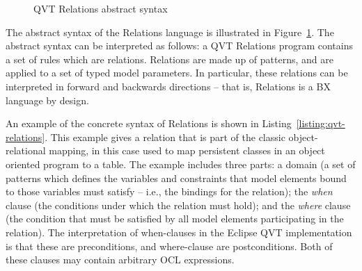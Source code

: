 \begin{figure}[htbp]
\caption{QVT Relations abstract syntax}
\label{fig:qvt-as}
\end{figure}

The abstract syntax of the Relations language is illustrated in Figure~\ref{fig:qvt-as}. The abstract syntax can be interpreted as follows: a QVT Relations program contains a set of rules which are relations. Relations are made up of patterns, and are applied to a set of typed model parameters. In particular, these relations can be interpreted in forward and backwards directions -- that is, Relations is a BX language by design.

An example of the concrete syntax of Relations is shown in Listing~\ref{listing:qvt-relations}. This example gives a relation that is part of the classic object-relational mapping, in this case used to map persistent classes in an object oriented program to a table. The example includes three parts: a domain (a set of patterns which defines the variables and constraints that model elements bound to those variables must satisfy -- i.e., the bindings for the relation); the \textit{when} clause (the conditions under which the relation must hold); and the \textit{where} clause (the condition that must be satisfied by all model elements participating in the relation). The interpretation of when-clauses in the Eclipse QVT implementation is that these are preconditions, and where-clause are postconditions. Both of these clauses may contain arbitrary OCL expressions.


